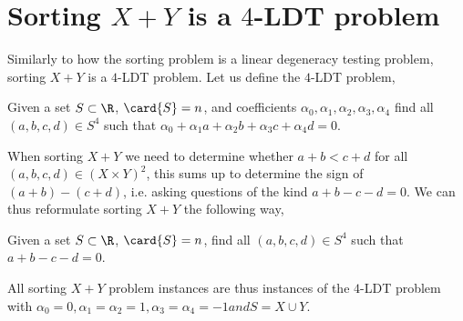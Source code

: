 \section{Sorting $X+Y$ is a $4$-LDT problem}

Similarly to how the sorting problem is a linear degeneracy testing problem,
sorting $X+Y$ is a $4$-LDT problem. Let us define the $4$-LDT problem,

\begin{problem}
Given a set $S \subset \R$, $\card{S} = n$, and coefficients $\alpha_0,
\alpha_1, \alpha_2, \alpha_3, \alpha_4$ find all $(a,b,c,d) \in S^4$ such that
$\alpha_0 + \alpha_1 a + \alpha_2 b + \alpha_3 c + \alpha_4 d = 0$.
\end{problem}

When sorting $X+Y$ we need to determine whether $a + b < c + d$ for all
$(a,b,c,d) \in (X \times Y)^2$, this sums up to determine the sign of $(a+b) -
(c+d)$, i.e. asking questions of the kind $a + b - c - d = 0$. We can thus
reformulate sorting $X+Y$ the following way,

\begin{problem}
Given a set $S \subset \R$, $\card{S} = n$, find all $(a,b,c,d) \in S^4$ such
that $a + b - c - d = 0$.
\end{problem}

All sorting $X+Y$ problem instances are thus instances of the $4$-LDT problem
with $\alpha_0 = 0, \alpha_1 = \alpha_2 = 1, \alpha_3 = \alpha_4 = -1 and S = X
\cup Y$.

